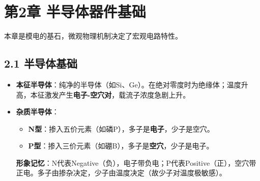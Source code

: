 \documentclass[12pt,a4paper]{ctexart}
\begin{document}
	\section*{第2章 半导体器件基础}
	本章是模电的基石，微观物理机制决定了宏观电路特性。
	\subsection*{2.1 半导体基础}
	\begin{itemize}
		\item \textbf{本征半导体}：纯净的半导体（如Si、Ge）。在绝对零度时为绝缘体；温度升高，本征激发产生\textbf{电子-空穴对}，载流子浓度急剧上升。
		\item \textbf{杂质半导体}：
		\begin{itemize}
			\item \textbf{N型}：掺入五价元素（如磷P），多子是\textbf{电子}，少子是空穴。
			\item \textbf{P型}：掺入三价元素（如硼B），多子是\textbf{空穴}，少子是电子。
		\end{itemize}
		\textbf{形象记忆}：N代表Negative（负），电子带负电；P代表Positive（正），空穴带正电。多子由掺杂决定，少子由温度决定（故少子对温度极敏感）。
	\end{itemize}
\end{document}
